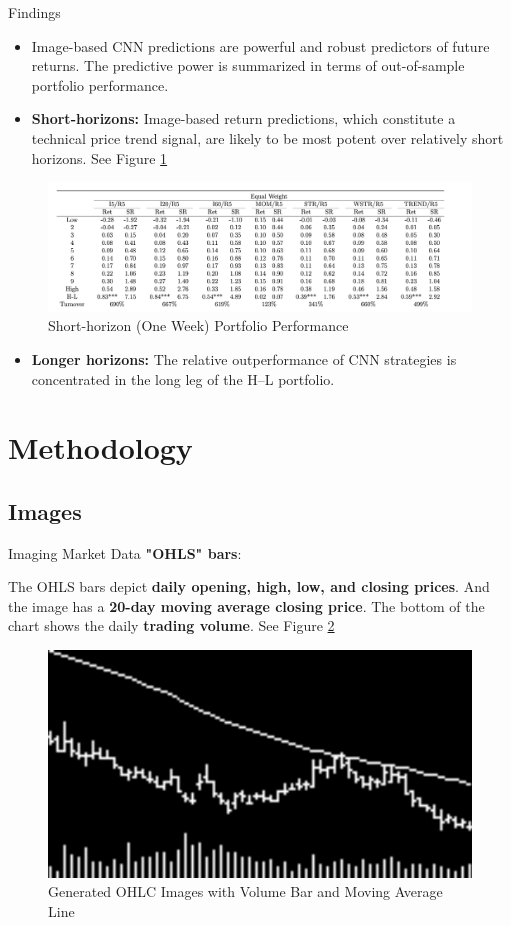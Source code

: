 \documentclass{beamer}
\begin{document}
\begin{frame}{Findings}
\begin{itemize}
    \item Image-based CNN predictions are powerful and robust predictors of future returns. The predictive power is summarized in terms of out-of-sample portfolio performance.
    \item \textbf{Short-horizons: }Image-based return predictions, which constitute a technical price trend signal, are likely to be most potent over relatively short horizons. See Figure \ref{fig:1}
\end{itemize}
\begin{figure}[h]
    \centering
    \includegraphics[width=.7\textwidth]{images/1 short-horizon portfolio performance.png}
    \caption{Short-horizon (One Week) Portfolio Performance}
    \label{fig:1}
\end{figure}
\begin{itemize}
    \item \textbf{Longer horizons: }The relative outperformance of CNN strategies is concentrated in the long leg of the H–L portfolio.
\end{itemize}
\end{frame}

\section{Methodology}
\subsection{Images}
\begin{frame}{Imaging Market Data}
\textbf{"OHLS" bars}:

The OHLS bars depict \textbf{daily opening, high, low, and closing prices}. And the image has a \textbf{20-day moving average closing price}. The bottom of the chart shows the daily \textbf{trading volume}. See Figure \ref{fig:2}

\begin{figure}[h]
    \centering
    \includegraphics[width=.7\textwidth]{images/2 Generated OHLC Images with Volume Bar and Moving Average Line.png}
    \caption{Generated OHLC Images with Volume Bar and Moving Average Line
}
    \label{fig:2}
\end{figure}
\end{frame}
\end{document}
